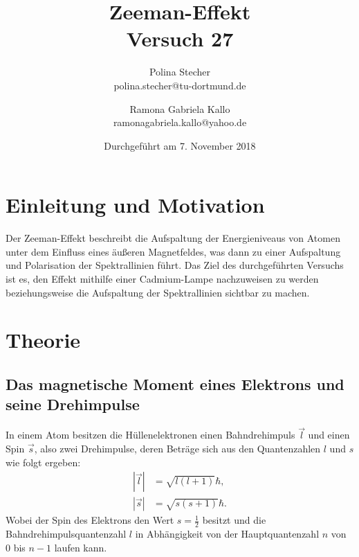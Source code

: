 \documentclass{article}
\begin{document}
	\scriptsize \normalsize
	\title{Zeeman-Effekt \\ Versuch 27}
	

	
	\author{Polina Stecher\\ {polina.stecher@tu-dortmund.de} \and Ramona Gabriela Kallo \\{ramonagabriela.kallo@yahoo.de} } %
	\date{Durchgeführt am 7. November 2018}
	\maketitle
	\newpage
	
	\tableofcontents
	\thispagestyle{empty}
	
	
	
	\newpage
	\section{Einleitung und Motivation}
	\label{sec:EinleitungundMotivation}
	
	Der Zeeman-Effekt beschreibt die Aufspaltung der Energieniveaus von Atomen unter dem Einfluss eines äußeren Magnetfeldes, was dann zu einer Aufspaltung und Polarisation der Spektrallinien führt. Das Ziel des durchgeführten Versuchs ist es, den Effekt mithilfe einer Cadmium-Lampe nachzuweisen zu werden beziehungsweise die Aufspaltung der Spektrallinien sichtbar zu machen.
	
	\section{Theorie}
	\label{sec:Theorie}
	
	\subsection{Das magnetische Moment eines Elektrons und seine Drehimpulse}
	\label{sec:DasmagMoment}
	In einem Atom besitzen die Hüllenelektronen einen Bahndrehimpuls $\vec{l}$ und einen Spin $\vec{s}$, also zwei Drehimpulse, deren Beträge sich aus den Quantenzahlen $l$ und $s$ wie folgt ergeben:
	\begin{align}
	|\vec{l}|&=\sqrt{l(l+1)}\hbar,\\
	|\vec{s}|&=\sqrt{s(s+1)}\hbar.
	\end{align}
	Wobei der Spin des Elektrons den Wert $s = \frac{1}{2}$ besitzt und die Bahndrehimpulsquantenzahl $l$ in Abhängigkeit von der Hauptquantenzahl $n$ von $0$ bis $n-1$ laufen kann. 
	
\end{document}
